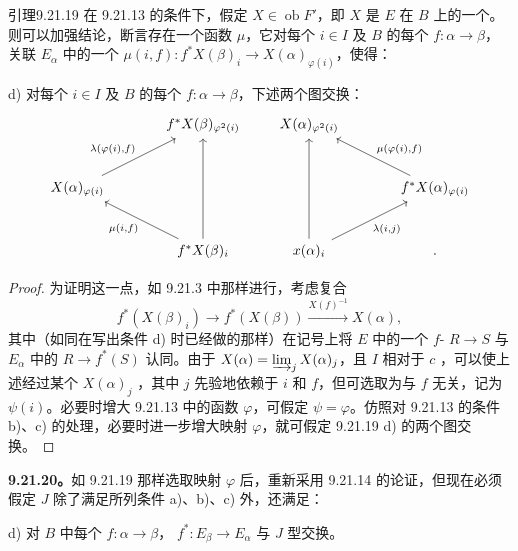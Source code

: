 \begin{SGAresult}{引理}{9.21.19}
在 9.21.13 的条件下，假定 $X\in\operatorname{ob}F'$，即 $X$ 是 $E$ 在 $B$ 上的一个。则可以加强结论，断言存在一个函数 $\mu$，它对每个 $i\in I$ 及 $B$ 的每个 $f:\alpha\to\beta$，关联 $E_\alpha$ 中的一个 $\mu(i,f):f^*X(\beta)_i\to X(\alpha)_{\varphi(i)}$，使得：

d) 对每个 $i\in I$ 及 $B$ 的每个 $f:\alpha\to\beta$，下述两个图交换：
\[
\begin{tikzcd}[column sep=large,row sep=large]
&f^*X(\beta)_{\varphi^2(i)}\\
X(\alpha)_{\varphi(i)}\arrow[ur,"{\lambda(\varphi(i),f)}"]&\\
&f^*X(\beta)_i\arrow[uu]\arrow[ul,"{\mu(i,f)}"]
\end{tikzcd}
\qquad
\begin{tikzcd}[column sep=large,row sep=large]
X(\alpha)_{\varphi^2(i)}&\\
&f^*X(\alpha)_{\varphi(i)}\arrow[ul,"{\mu(\varphi(i),f)}"']\\
x(\alpha)_i\arrow[uu]\arrow[ur,"{\lambda(i,j)}"']& .
\end{tikzcd}
\]
\end{SGAresult}
\begin{proof}
为证明这一点，如 9.21.3 中那样进行，考虑复合
\[
f^*(X(\beta)_i)\longrightarrow f^*(X(\beta))
\xrightarrow{X(f)^{-1}}X(\alpha),
\]
其中（如同在写出条件 d) 时已经做的那样）在记号上将 $E$ 中的一个 $f$- $R\to S$ 与 $E_\alpha$ 中的 $R\to f^*(S)$ 认同。由于 $X(\alpha)=\varinjlim_jX(\alpha)_j$，且 $I$ 相对于 $c$ ，可以使上述经过某个 $X(\alpha)_j$ ，其中 $j$ 先验地依赖于 $i$ 和 $f$，但可选取为与 $f$ 无关，记为 $\psi(i)$。必要时增大 9.21.13 中的函数 $\varphi$，可假定 $\psi=\varphi$。仿照对 9.21.13 的条件 b)、c) 的处理，必要时进一步增大映射 $\varphi$，就可假定 9.21.19 d) 的两个图交换。
\end{proof}

\textbf{9.21.20。}如 9.21.19 那样选取映射 $\varphi$ 后，重新采用 9.21.14 的论证，但现在必须假定 $J$ 除了满足所列条件 a)、b)、c) 外，还满足：

d) 对 $B$ 中每个 $f:\alpha\to\beta$， $f^*:E_\beta\to E_\alpha$ 与 $J$ 型交换。

